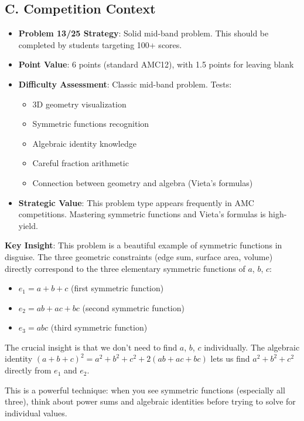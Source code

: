 \documentclass[12pt]{article}
\begin{document}
\begin{competitionbox}
\subsection*{C. Competition Context}
\begin{itemize}[leftmargin=*]
    \item \textbf{Problem 13/25 Strategy}: Solid mid-band problem. This should be completed by students targeting 100+ scores.
    \item \textbf{Point Value}: 6 points (standard AMC12), with 1.5 points for leaving blank
    \item \textbf{Difficulty Assessment}: Classic mid-band problem. Tests:
    \begin{itemize}
        \item 3D geometry visualization
        \item Symmetric functions recognition
        \item Algebraic identity knowledge
        \item Careful fraction arithmetic
        \item Connection between geometry and algebra (Vieta's formulas)
    \end{itemize}
    \item \textbf{Strategic Value}: This problem type appears frequently in AMC competitions. Mastering symmetric functions and Vieta's formulas is high-yield.
\end{itemize}
\end{competitionbox}

\begin{keyinsightbox}
\textbf{Key Insight}: This problem is a beautiful example of symmetric functions in disguise. The three geometric constraints (edge sum, surface area, volume) directly correspond to the three elementary symmetric functions of $a$, $b$, $c$:
\begin{itemize}
    \item $e_1 = a+b+c$ (first symmetric function)
    \item $e_2 = ab+ac+bc$ (second symmetric function)  
    \item $e_3 = abc$ (third symmetric function)
\end{itemize}

The crucial insight is that we don't need to find $a$, $b$, $c$ individually. The algebraic identity $(a+b+c)^2 = a^2+b^2+c^2 + 2(ab+ac+bc)$ lets us find $a^2+b^2+c^2$ directly from $e_1$ and $e_2$.

This is a powerful technique: when you see symmetric functions (especially all three), think about power sums and algebraic identities before trying to solve for individual values.
\end{keyinsightbox}
\end{document}
